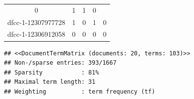 \documentclass[]{article}
\begin{document}
\begin{longtable}[c]{@{}ccccc@{}}
\begin{minipage}[t]{0.11\columnwidth}
0
\strut\end{minipage} &
\begin{minipage}[t]{0.10\columnwidth}\centering\strut
1
\strut\end{minipage} &
\begin{minipage}[t]{0.12\columnwidth}\centering\strut
1
\strut\end{minipage} &
\begin{minipage}[t]{0.12\columnwidth}\centering\strut
0
\strut\end{minipage}\tabularnewline
\begin{minipage}[t]{0.23\columnwidth}\centering\strut
dfcc-1-12307977728
\strut\end{minipage} &
\begin{minipage}[t]{0.11\columnwidth}\centering\strut
1
\strut\end{minipage} &
\begin{minipage}[t]{0.10\columnwidth}\centering\strut
0
\strut\end{minipage} &
\begin{minipage}[t]{0.12\columnwidth}\centering\strut
1
\strut\end{minipage} &
\begin{minipage}[t]{0.12\columnwidth}\centering\strut
0
\strut\end{minipage}\tabularnewline
\begin{minipage}[t]{0.23\columnwidth}\centering\strut
dfcc-1-12306912058
\strut\end{minipage} &
\begin{minipage}[t]{0.11\columnwidth}\centering\strut
0
\strut\end{minipage} &
\begin{minipage}[t]{0.10\columnwidth}\centering\strut
0
\strut\end{minipage} &
\begin{minipage}[t]{0.12\columnwidth}\centering\strut
0
\strut\end{minipage} &
\begin{minipage}[t]{0.12\columnwidth}\centering\strut
0
\strut\end{minipage}\tabularnewline
\bottomrule
\end{longtable}

\begin{verbatim}
## <<DocumentTermMatrix (documents: 20, terms: 103)>>
## Non-/sparse entries: 393/1667
## Sparsity           : 81%
## Maximal term length: 31
## Weighting          : term frequency (tf)
\end{verbatim}
\end{document}
